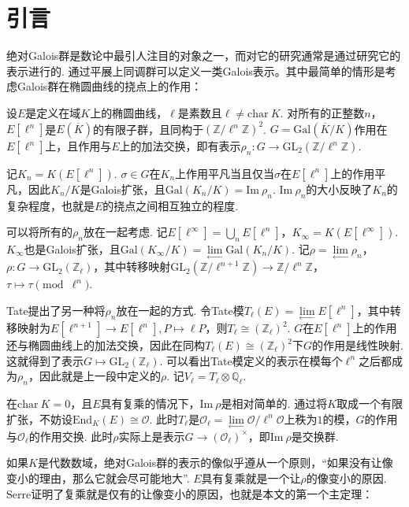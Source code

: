\chapter{引言}

绝对Galois群是数论中最引人注目的对象之一，而对它的研究通常是通过研究它的表示进行的.
通过平展上同调群可以定义一类Galois表示。其中最简单的情形是考虑Galois群在椭圆曲线的挠点上的作用：

设$E$是定义在域$K$上的椭圆曲线，$\ell$是素数且$\ell\neq \mathrm{char}\ K$. 对所有的正整数$n$，$E[\ell^n]$是$E(\overline{K})$的有限子群，且同构于$(\mathbb{Z}/\ell^n\mathbb{Z})^2$. $G = \mathrm{Gal}(\overline{K}/K)$作用在$E[\ell^n]$上，且作用与$E$上的加法交换，即有表示$\rho_n:G\to \mathrm{GL}_2(\mathbb{Z}/\ell^n \mathbb{Z})$.

记$K_n=K(E[\ell^n])$. $\sigma\in G$在$K_n$上作用平凡当且仅当$\sigma$在$E[\ell^n]$上的作用平凡，因此$K_n/K$是Galois扩张，且$\mathrm{Gal}(K_n/K)=\mathrm{Im}\ \rho_n$. $\mathrm{Im}\ \rho_n$的大小反映了$K_n$的复杂程度，也就是$E$的挠点之间相互独立的程度.

可以将所有的$\rho_n$放在一起考虑. 记$E[\ell^{\infty}]=\bigcup_n E[\ell^n]$，$K_{\infty} = K(E[\ell^{\infty}])$. $K_{\infty}$也是Galois扩张，且$\mathrm{Gal}(K_{\infty}/K) = \lim\limits_{\longleftarrow} \mathrm{Gal}(K_n/K)$. 记$\rho = \lim\limits_{\longleftarrow} \rho_n$，$\rho: G\to \mathrm{GL}_2(\mathbb{Z}_{\ell})$，其中转移映射$\mathrm{GL}_2(\mathbb{Z}/\ell^{n+1} \mathbb{Z}) \to \mathbb{Z}/\ell^n \mathbb{Z}$，$\tau \mapsto \tau \pmod{\ell^n}$.

Tate提出了另一种将$\rho_n$放在一起的方式. 令Tate模$T_{\ell}(E) = \lim\limits_{\longleftarrow} E[\ell^n]$，其中转移映射为$E[\ell^{n+1}]\to E[\ell^n], P\mapsto \ell P$，则$T_{\ell}\cong (\mathbb{Z}_{\ell})^2$. $G$在$E[\ell^n]$上的作用还与椭圆曲线上的加法交换，因此在同构$T_{\ell}(E)\cong (\mathbb{Z}_{\ell})^2$下$G$的作用是线性映射. 这就得到了表示$G\mapsto \mathrm{GL}_2(\mathbb{Z}_{\ell})$. 可以看出Tate模定义的表示在模每个$\ell^n$之后都成为$\rho_n$，因此就是上一段中定义的$\rho$.
记$V_{\ell} = T_{\ell}\otimes \mathbb{Q}_{\ell}$.

在$\mathrm{char}\ K = 0$，且$E$具有复乘的情况下，$\mathrm{Im}\ \rho$是相对简单的. 通过将$K$取成一个有限扩张，不妨设$\mathrm{End}_K(E) \cong \mathcal{O}$. 此时$T_{\ell}$是$\mathcal{O}_{\ell} = \lim\limits_{\longleftarrow}\mathcal{O}/\ell^n \mathcal{O}$上秩为$1$的模，$G$的作用与$\mathcal{O}_{\ell}$的作用交换. 此时$\rho$实际上是表示$G\to (\mathcal{O}_{\ell})^{\times}$，即$\mathrm{Im}\ \rho$是交换群.

如果$K$是代数数域，绝对Galois群的表示的像似乎遵从一个原则，“如果没有让像变小的理由，那么它就会尽可能地大”. $E$具有复乘就是一个让$\rho$的像变小的原因. Serre证明了复乘就是仅有的让像变小的原因，也就是本文的第一个主定理：

